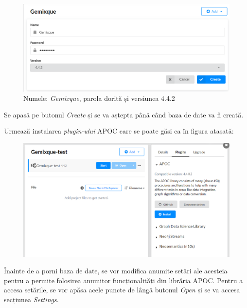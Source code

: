 \documentclass[12pt,a4paper]{report}
\begin{document}
\begin{enumerate}
  \begin{figure}[H]
\centering
\caption{}
\begin{adjustbox}{max size={\textwidth}{\textheight}}
\includegraphics[scale=1]{exemplu_44_add_database}
\end{adjustbox}
\caption*{Numele: \emph{Gemixque}, parola dorită și versiunea 4.4.2}
\end{figure}

  Se apasă pe butonul \emph{Create} și se va aștepta până când baza de date va fi creată.
  
  Urmează instalarea \emph{plugin-ului} APOC care se poate găsi ca în figura atașată:
  
    \begin{figure}[H]
\centering
\caption{}
\begin{adjustbox}{max size={\textwidth}{\textheight}}
\includegraphics[scale=1]{exemplu_52_apoc}
\end{adjustbox}
\caption*{}
\end{figure}
  
  Înainte de a porni baza de date, se vor modifica anumite setări ale acesteia pentru a permite folosirea anumitor funcționalități din librăria APOC. Pentru a accesa setările, se vor apăsa acele puncte de lângă butonul \emph{Open} și se va accesa secțiunea \emph{Settings}.
  

\end{enumerate}
\end{document}
